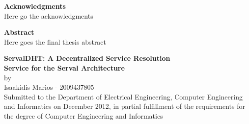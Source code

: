 \documentclass[12pt,a4paper,oneside]{article}
\begin{document}




\newpage
\thispagestyle{empty}
{\Large \bf \noindent Acknowledgments}
\\Here go the acknowledgments


\newpage
\thispagestyle{empty}
{\Large \bf \noindent Abstract}
\\Here goes the final thesis abstract


\newpage
\thispagestyle{empty}
\tableofcontents


\newpage
\pagestyle{plain}
\setcounter{page}{1}

\renewcommand{\nomname}{Abbreviations}
\printnomenclature


\newpage
\begin{center}
{\large {\bf  ServalDHT: A Decentralized Service Resolution\\ Service for the Serval Architecture}\\[0.5cm] by \\[0.5cm] Isaakidis Marios - 2009437805}
 ~\\[0.5cm]
Submitted to the Department of Electrical Engineering, Computer Engineering and Informatics on December 2012, in partial fulfillment of the requirements for the degree of Computer Engineering and Informatics
\end{center}

\vfill
\end{document}
